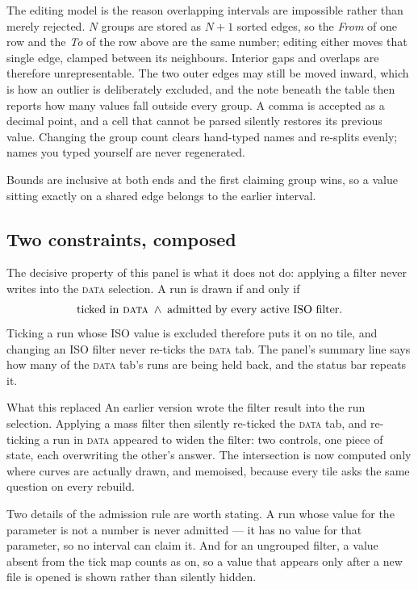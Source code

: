 \documentclass[11pt,a4paper,oneside]{report}
\newcommand{\tab}[1]{\textsc{#1}}
\begin{document}
The editing model is the reason overlapping intervals are impossible rather than
merely rejected. $N$ groups are stored as $N+1$ sorted edges, so the \emph{From}
of one row and the \emph{To} of the row above are the same number; editing either
moves that single edge, clamped between its neighbours. Interior gaps and
overlaps are therefore unrepresentable. The two outer edges may still be moved
inward, which is how an outlier is deliberately excluded, and the note beneath
the table then reports how many values fall outside every group. A comma is
accepted as a decimal point, and a cell that cannot be parsed silently restores
its previous value. Changing the group count clears hand-typed names and
re-splits evenly; names you typed yourself are never regenerated.

Bounds are inclusive at both ends and the first claiming group wins, so a value
sitting exactly on a shared edge belongs to the earlier interval.

\subsection{Two constraints, composed}

The decisive property of this panel is what it does not do: applying a filter
never writes into the \tab{data} selection. A run is drawn if and only if
\[
  \text{ticked in \tab{data}} \;\wedge\; \text{admitted by every active ISO filter.}
\]
Ticking a run whose ISO value is excluded therefore puts it on no tile, and
changing an ISO filter never re-ticks the \tab{data} tab. The panel's summary
line says how many of the \tab{data} tab's runs are being held back, and the
status bar repeats it.

\begin{aoenote}{What this replaced}
An earlier version wrote the filter result into the run selection. Applying a
mass filter then silently re-ticked the \tab{data} tab, and re-ticking a run in
\tab{data} appeared to widen the filter: two controls, one piece of state, each
overwriting the other's answer. The intersection is now computed only where
curves are actually drawn, and memoised, because every tile asks the same
question on every rebuild.
\end{aoenote}

Two details of the admission rule are worth stating. A run whose value for the
parameter is not a number is never admitted --- it has no value for that
parameter, so no interval can claim it. And for an ungrouped filter, a value
absent from the tick map counts as on, so a value that appears only after a new
file is opened is shown rather than silently hidden.
\end{document}
